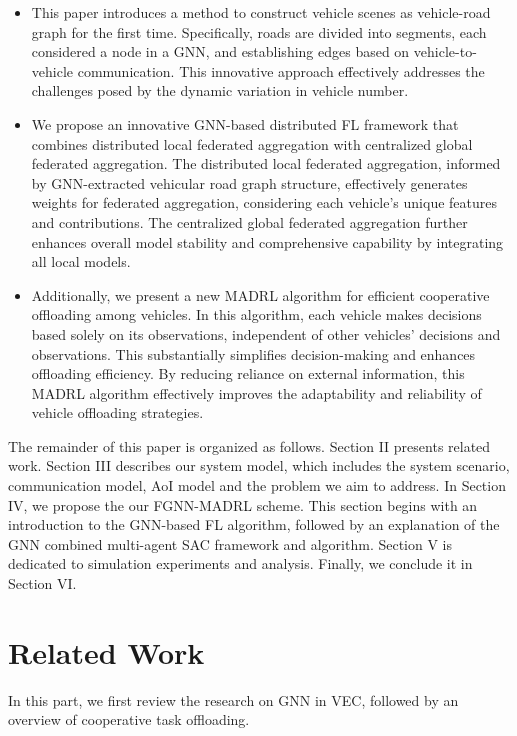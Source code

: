 \documentclass[lettersize,journal,onecolumn]{IEEEtran}
\begin{document}
\begin{itemize}
	\item{This paper introduces a method to construct vehicle scenes as vehicle-road graph for the first time. Specifically, roads are divided into segments, each considered a node in a GNN, and establishing edges based on vehicle-to-vehicle communication. This innovative approach effectively addresses the challenges posed by the dynamic variation in vehicle number.}
	
	\item{We propose an innovative GNN-based distributed FL framework that combines distributed local federated aggregation with centralized global federated aggregation. The distributed local federated aggregation, informed by GNN-extracted vehicular road graph structure, effectively generates weights for federated aggregation, considering each vehicle's unique features and contributions. The centralized global federated aggregation further enhances overall model stability and comprehensive capability by integrating all local models.}
	
	\item{Additionally, we present a new MADRL algorithm for efficient cooperative offloading among vehicles. In this algorithm, each vehicle makes decisions based solely on its observations, independent of other vehicles' decisions and observations. This substantially simplifies decision-making and enhances offloading efficiency. By reducing reliance on external information, this MADRL algorithm effectively improves the adaptability and reliability of vehicle offloading strategies.}
\end{itemize}

The remainder of this paper is organized as follows. Section II presents related work. Section III describes our system model, which includes the system scenario, communication model, AoI model and the problem we aim to address. In Section IV, we propose the our FGNN-MADRL scheme. This section begins with an introduction to the GNN-based FL algorithm, followed by an explanation of the GNN combined multi-agent SAC framework and algorithm. Section V is dedicated to simulation experiments and analysis. Finally, we conclude it in Section VI.

\section{Related Work}
\label{Related Work}
In this part, we first review the research on GNN in VEC, followed by an overview of cooperative task offloading.
\end{document}
